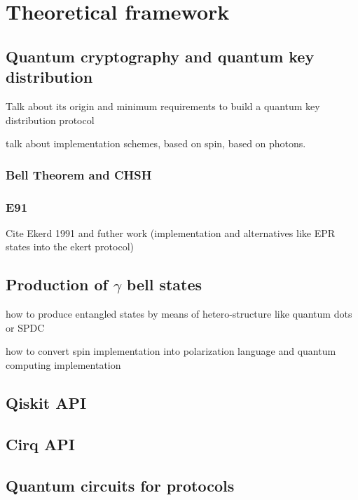 \section{Theoretical framework}

\subsection{Quantum cryptography and quantum key distribution}

Talk about its origin and minimum requirements to build a quantum key distribution protocol

talk about implementation schemes, based on spin, based on photons.

\subsubsection{Bell Theorem and CHSH}

\subsubsection{E91}

Cite Ekerd 1991 \cite{ekert1991quantum} and futher work (implementation and alternatives like EPR states into the ekert protocol)

\subsection{Production of $\gamma$ bell states}

how to produce entangled states by means of hetero-structure like quantum dots or SPDC

how to convert spin implementation into polarization language and quantum computing implementation

\subsection{Qiskit API}

\subsection{Cirq API}

\subsection{Quantum circuits for protocols}